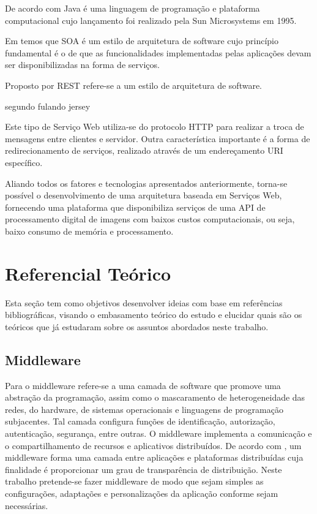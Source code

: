 \documentclass[12pt]{article}
\begin{document}
De acordo com \cite{oracle} Java é uma linguagem de programação e plataforma computacional cujo lançamento foi realizado pela Sun Microsystems em 1995.

Em \cite{soa1,soa2} temos que SOA é um estilo de arquitetura de software cujo princípio fundamental é o de que as funcionalidades implementadas pelas aplicações devam ser disponibilizadas na forma de serviços.

Proposto por \cite{rest} REST refere-se a um estilo de arquitetura de software.



segundo fulando jersey



Este tipo de Serviço Web utiliza-se do protocolo HTTP para realizar a troca
de mensagens entre clientes e servidor. Outra característica importante é a forma de
redirecionamento de serviços, realizado através de um endereçamento URI
específico.

Aliando todos os fatores e tecnologias apresentados anteriormente, torna-se
possível o desenvolvimento de uma arquitetura baseada em Serviços Web,
fornecendo uma plataforma que disponibiliza serviços de uma API de processamento digital de imagens
com baixos custos computacionais, ou seja, baixo consumo de memória e processamento.

\section{Referencial Teórico} \label{sec:firstpage}

Esta seção tem como objetivos desenvolver ideias com base em referências bibliográficas, visando o embasamento teórico do estudo e elucidar quais são os teóricos que já estudaram sobre os assuntos abordados neste trabalho.

\subsection{Middleware}

Para \cite{coulouris:05} o middleware refere-se a uma camada de software
que promove uma abstração da programação, assim como o mascaramento de
heterogeneidade das redes, do hardware, de sistemas operacionais e linguagens de
programação subjacentes. Tal camada configura funções de identificação, autorização,
autenticação, segurança, entre outras. O middleware implementa a comunicação e o
compartilhamento de recursos e aplicativos distribuídos.
De acordo com \cite{tanenbaum:07}, um middleware forma uma camada entre aplicações e plataformas distribuídas
cuja finalidade é proporcionar um grau de transparência de distribuição. 
Neste trabalho pretende-se fazer middleware de modo que sejam simples as
configurações, adaptações e personalizações da aplicação conforme sejam necessárias.
\end{document}
